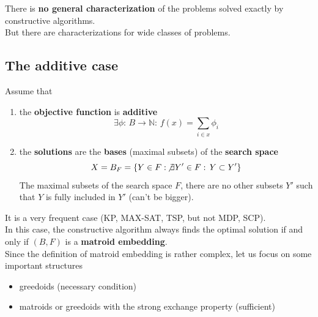 There is \textbf{no general characterization} of the problems solved exactly by constructive algorithms.\\

But there are characterizations for wide classes of problems.\\

\newpage

\subsection{The additive case}
Assume that
\begin{enumerate}
	\item the \textbf{objective function} is \textbf{additive}
	$$ \exists \phi: \, B \rightarrow \mathbb{N}: \, f(x) = \sum_{i \in x} \phi_i $$
	
	\item the \textbf{solutions} are the \textbf{bases} (maximal subsets) of the \textbf{search space}
	$$ X = B_F = \left\{Y \in F: \, \not \exists Y' \in F: \, Y \subset Y' \right\} $$
	The maximal subsets of the search space $F$, there are no other subsets $Y'$ such that $Y$ is fully included in $Y'$ (can't be bigger).
\end{enumerate}

It is a very frequent case (KP, MAX-SAT, TSP, but not MDP, SCP).\\

In this case, the constructive algorithm always finds the optimal solution if and only if $(B, F)$ is a \textbf{matroid embedding}.\\

Since the definition of matroid embedding is rather complex, let us focus on some important structures
\begin{itemize}
	\item greedoids (necessary condition)
	\item matroids or greedoids with the strong exchange property (sufficient)
\end{itemize}

\newpage

